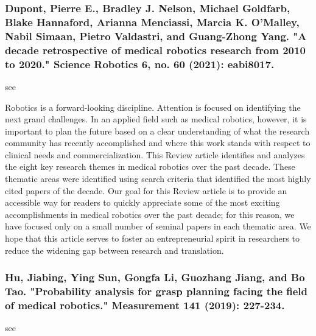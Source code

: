 \documentclass[conference]{IEEEtran}
\begin{document}
\medskip
\subsubsection{Dupont, Pierre E., Bradley J. Nelson, Michael Goldfarb, Blake Hannaford, Arianna Menciassi, Marcia K. O’Malley, Nabil Simaan, Pietro Valdastri, and Guang-Zhong Yang. "A decade retrospective of medical robotics research from 2010 to 2020." Science Robotics 6, no. 60 (2021): eabi8017.}
see \cite{dupont2021decade}

Robotics is a forward-looking discipline. Attention is focused on identifying the next grand challenges. In an applied field such as medical robotics, however, it is important to plan the future based on a clear understanding of what the research community has recently accomplished and where this work stands with respect to clinical needs and commercialization. This Review article identifies and analyzes the eight key research themes in medical robotics over the past decade. These thematic areas were identified using search criteria that identified the most highly cited papers of the decade. Our goal for this Review article is to provide an accessible way for readers to quickly appreciate some of the most exciting accomplishments in medical robotics over the past decade; for this reason, we have focused only on a small number of seminal papers in each thematic area. We hope that this article serves to foster an entrepreneurial spirit in researchers to reduce the widening gap between research and translation.

\medskip
\subsubsection{Hu, Jiabing, Ying Sun, Gongfa Li, Guozhang Jiang, and Bo Tao. "Probability analysis for grasp planning facing the field of medical robotics." Measurement 141 (2019): 227-234.}
see \cite{hu2019probability}
\end{document}
